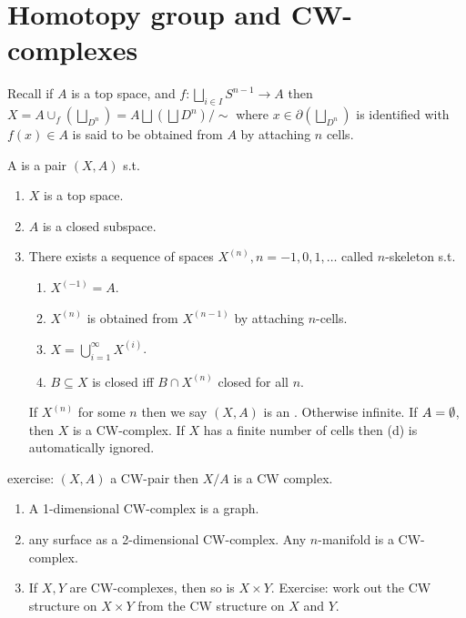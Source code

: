 \documentclass[12pt,class=article,crop=false]{standalone}
\begin{document}
\section{Homotopy group and CW-complexes}

Recall if $ A$ is a top space, and  $ f: \bigsqcup_{ i \in I} S^{n-1} \to A$ then $ X = A \cup _f ( \bigsqcup_{ D^{n}}) = A \bigsqcup ( \bigsqcup D^{n}) / \sim$ where $ x \in \partial ( \bigsqcup_{ D^{n}})$ is identified with $ f(x) \in A$ is said to be obtained from $ A$ by attaching  $ n$ cells.

A   is a pair $ (X,A)$  s.t.\ 
\begin{enumerate}[label=(\arabic*)]
	\item $ X$ is a top space.
	\item  $ A$ is a closed subspace.
	\item There exists a sequence of spaces  $ X^{(n)}, n=-1,0,1,\ldots$ called $ n$-skeleton  s.t.\
		\begin{enumerate}[label=(\alph*)]
			\item $ X^{(-1)} = A$.
			\item $ X^{(n)}$ is obtained from $ X^{(n-1)}$ by attaching $ n$-cells.
			\item  $ X = \bigcup_{ i =1}^{\infty} X^{(i)}$.
			\item $ B \subseteq X$ is closed iff $ B \cap X^{(n)}$ closed for all $ n$.
		\end{enumerate}
	If $ X^{(n)}$ for some $ n$ then we say  $ (X,A)$ is an  . Otherwise infinite. If $ A = \emptyset$, then $ X$ is a CW-complex. If  $ X$ has a finite number of cells then  (d) is automatically ignored. 
\end{enumerate}

exercise: $ (X,A)$ a CW-pair then  $ X /A$ is a CW complex.

 \begin{eg}
\begin{enumerate}[label=(\arabic*)]
	\item A 1-dimensional CW-complex is a graph.
	\item any surface as a 2-dimensional CW-complex. Any $ n$-manifold is a CW-complex.
	\item If  $ X,Y$ are CW-complexes, then so is  $ X \times Y$. Exercise: work out the CW structure on $ X \times Y$ from the CW structure on $ X$ and  $ Y$.
\end{enumerate}
\end{eg}
\end{document}
